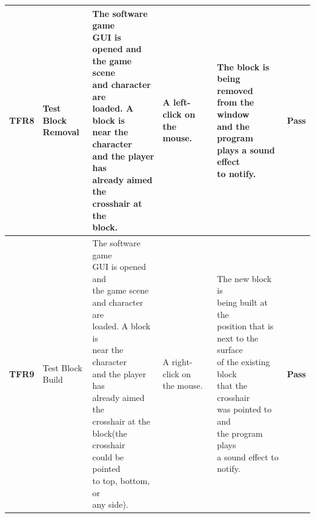 \documentclass[12pt, titlepage]{article}
\begin{document}
\begin{center}
\begin{longtable}[!bpht]{|m{1.3cm}|m{2.3cm}|m{3.4cm}|m{3.4cm}|m{3.4cm}|m{1cm}|}
\textbf{TFR8} & \makecell[ml]{Test Block\\ Removal} & \makecell[ml]{The software game\\ GUI is opened and\\ the game scene\\ and character are\\ loaded. A block is\\ near the character\\ and the player has\\ already aimed the\\ crosshair at the\\ block.} & \makecell[ml]{A left-click on\\ the mouse.} & \makecell[ml]{The block is\\ being removed\\ from the window\\ and the program\\ plays a sound effect\\ to notify.} & \textbf{Pass}\\\hline

\textbf{TFR9} & \makecell[ml]{Test Block\\ Build} & \makecell[ml]{The software game\\ GUI is opened and\\ the game scene\\ and character are\\ loaded. A block is\\ near the character\\ and the player has\\ already aimed the\\ crosshair at the\\ block(the crosshair\\ could be pointed\\ to top, bottom, or\\ any side).} & \makecell[ml]{A right-click on\\ the mouse.} & \makecell[ml]{The new block is\\ being built at the\\ position that is\\ next to the surface\\ of \hspace{-0.5mm}the \hspace{-0.5mm}existing \hspace{-0.5mm}block\\ that the crosshair\\ was pointed to and\\ the program plays\\ a sound effect to\\ notify.} & \textbf{Pass}\\\hline


\end{longtable}
\end{center}
\end{document}
